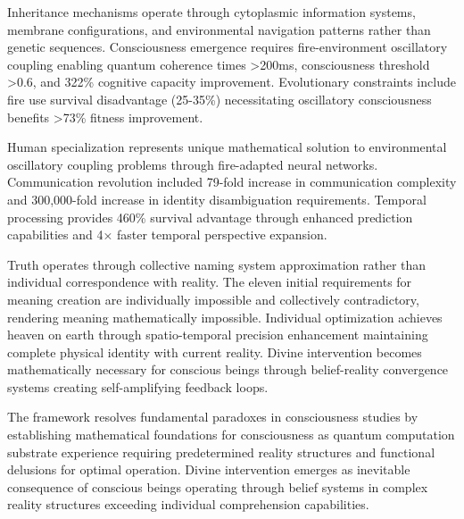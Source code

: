 \documentclass[12pt,a4paper]{article}
\begin{document}
Inheritance mechanisms operate through cytoplasmic information systems, membrane configurations, and environmental navigation patterns rather than genetic sequences. Consciousness emergence requires fire-environment oscillatory coupling enabling quantum coherence times >200ms, consciousness threshold >0.6, and 322\% cognitive capacity improvement. Evolutionary constraints include fire use survival disadvantage (25-35\%) necessitating oscillatory consciousness benefits >73\% fitness improvement.

Human specialization represents unique mathematical solution to environmental oscillatory coupling problems through fire-adapted neural networks. Communication revolution included 79-fold increase in communication complexity and 300,000-fold increase in identity disambiguation requirements. Temporal processing provides 460\% survival advantage through enhanced prediction capabilities and 4× faster temporal perspective expansion.

Truth operates through collective naming system approximation rather than individual correspondence with reality. The eleven initial requirements for meaning creation are individually impossible and collectively contradictory, rendering meaning mathematically impossible. Individual optimization achieves heaven on earth through spatio-temporal precision enhancement maintaining complete physical identity with current reality. Divine intervention becomes mathematically necessary for conscious beings through belief-reality convergence systems creating self-amplifying feedback loops.

The framework resolves fundamental paradoxes in consciousness studies by establishing mathematical foundations for consciousness as quantum computation substrate experience requiring predetermined reality structures and functional delusions for optimal operation. Divine intervention emerges as inevitable consequence of conscious beings operating through belief systems in complex reality structures exceeding individual comprehension capabilities.


\end{document}
